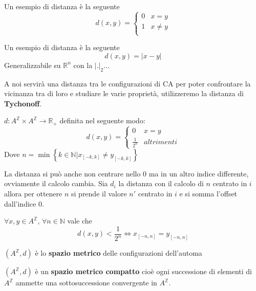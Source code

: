 \begin{esempio}
    Un esempio di distanza è la seguente
    $$d(x,y) =\begin{cases}
            0 & x=y    \\
            1 & x\ne y \\
        \end{cases}$$
\end{esempio}

\begin{esempio}
    Un esempio di distanza è la seguente
    $$d(x,y) =|x-y|$$
    Generalizzabile su $\mathbb{R}^n$ con la $|.|_2$$\dots$
\end{esempio}

A noi servirà una distanza tra le configurazioni di CA per poter confrontare
la vicinanza tra di loro e studiare le varie proprietà, utilizzeremo la distanza di
\textbf{Tychonoff}.
\begin{definizione} 
    $d:A^\mathbb{Z}\times A^\mathbb{Z} \rightarrow \mathbb{R}_+$ definita nel
    seguente modo:
    $$d(x,y) = \begin{cases}
            0             & x=y        \\
            \frac{1}{2^n} & altrimenti
        \end{cases}$$
    Dove $n= \min\left\{k\in \mathbb{N} | x_{[-k,k]} \ne y_{[-k,k]}\right\}$
\end{definizione}

La distanza si può anche non centrare nello $0$ ma in un altro indice differente,
ovviamente il calcolo cambia. Sia $d_i$ la distanza con il calcolo di $n$ centrato
in $i$ allora per ottenere $n$ si prende il valore $n'$ centrato in $i$ e si somma
l'offset dall'indice $0$.

\begin{nota}  \label{prop:dist}
    $\forall x,y\in A^\mathbb{Z}$, $\forall n\in \mathbb{N}$ vale che
    $$d(x,y)< \frac{1}{2^n}\iff x_{[-n, n]}=y_{[-n, n]}$$
\end{nota}

\begin{definizione}
    $(A^\mathbb{Z}, d)$ è lo \textbf{spazio metrico} delle configurazioni dell'automa
\end{definizione}

\begin{nota} 
    $(A^\mathbb{Z}, d)$ è un \textbf{spazio metrico compatto} cioè ogni successione
    di elementi di $A^\mathbb{Z}$ ammette una sottosuccessione convergente in $A^\mathbb{Z}$.
\end{nota}

